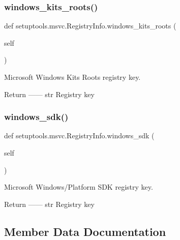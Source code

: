 \subsubsection{\texorpdfstring{windows\+\_\+kits\+\_\+roots()}{windows\_kits\_roots()}}
{\footnotesize\ttfamily def setuptools.\+msvc.\+Registry\+Info.\+windows\+\_\+kits\+\_\+roots (\begin{DoxyParamCaption}\item[{}]{self }\end{DoxyParamCaption})}

\begin{DoxyVerb}Microsoft Windows Kits Roots registry key.

Return
------
str
    Registry key
\end{DoxyVerb}
 \mbox{\label{classsetuptools_1_1msvc_1_1RegistryInfo_a8702bae8743189fe1c6d3fe77a9f4aa1}} 
\subsubsection{\texorpdfstring{windows\+\_\+sdk()}{windows\_sdk()}}
{\footnotesize\ttfamily def setuptools.\+msvc.\+Registry\+Info.\+windows\+\_\+sdk (\begin{DoxyParamCaption}\item[{}]{self }\end{DoxyParamCaption})}

\begin{DoxyVerb}Microsoft Windows/Platform SDK registry key.

Return
------
str
    Registry key
\end{DoxyVerb}
 

\subsection{Member Data Documentation}
\mbox{\label{classsetuptools_1_1msvc_1_1RegistryInfo_ae0ddb2af656e0c3892f77268563edbe1}} 
